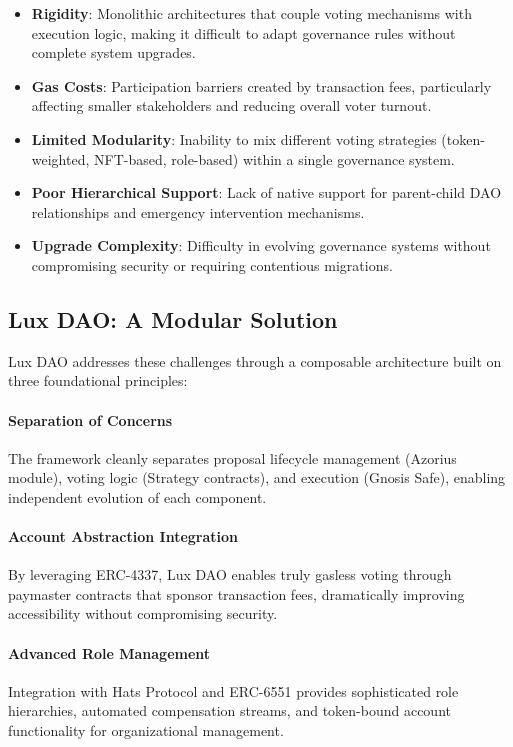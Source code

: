 \documentclass[11pt,a4paper]{article}
\begin{document}
\begin{itemize}
    \item \textbf{Rigidity}: Monolithic architectures that couple voting mechanisms with execution logic, making it difficult to adapt governance rules without complete system upgrades.
    \item \textbf{Gas Costs}: Participation barriers created by transaction fees, particularly affecting smaller stakeholders and reducing overall voter turnout.
    \item \textbf{Limited Modularity}: Inability to mix different voting strategies (token-weighted, NFT-based, role-based) within a single governance system.
    \item \textbf{Poor Hierarchical Support}: Lack of native support for parent-child DAO relationships and emergency intervention mechanisms.
    \item \textbf{Upgrade Complexity}: Difficulty in evolving governance systems without compromising security or requiring contentious migrations.
\end{itemize}

\subsection{Lux DAO: A Modular Solution}

Lux DAO addresses these challenges through a composable architecture built on three foundational principles:

\paragraph{Separation of Concerns} The framework cleanly separates proposal lifecycle management (Azorius module), voting logic (Strategy contracts), and execution (Gnosis Safe), enabling independent evolution of each component.

\paragraph{Account Abstraction Integration} By leveraging ERC-4337, Lux DAO enables truly gasless voting through paymaster contracts that sponsor transaction fees, dramatically improving accessibility without compromising security.

\paragraph{Advanced Role Management} Integration with Hats Protocol and ERC-6551 provides sophisticated role hierarchies, automated compensation streams, and token-bound account functionality for organizational management.
\end{document}
